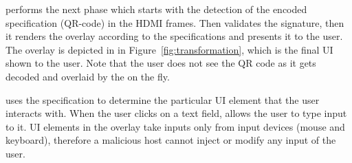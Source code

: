  \device performs the next phase which starts with the detection of the encoded specification (QR-code) in the HDMI frames. Then \device validates the signature, then it renders the overlay according to the specifications and presents it to the user.  The \device overlay is depicted in \three in Figure~\ref{fig:transformation}, which is the final UI shown to the user. Note that the user does not see the QR code as it gets decoded and overlaid by the \device on the fly.


\device uses the specification to determine the particular UI element that the user interacts with. When the user clicks on a text field, \device allows the user to type input to it. UI elements in the overlay take inputs only from input devices (mouse and keyboard), therefore a malicious host cannot inject or modify any input of the user.




